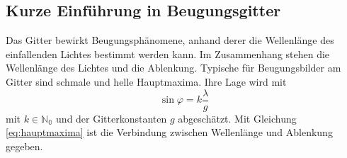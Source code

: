 \subsection{Kurze Einführung in Beugungsgitter}
Das Gitter bewirkt Beugungsphänomene, anhand derer die Wellenlänge des einfallenden Lichtes bestimmt werden kann.
Im Zusammenhang stehen die Wellenlänge des Lichtes und die Ablenkung.
%
Typische für Beugungsbilder am Gitter sind schmale und helle Hauptmaxima.
Ihre Lage wird mit 
\begin{equation}
	\sin{\varphi}= k\frac{\lambda}{g} 
	\label{eq:hauptmaxima}
\end{equation}
mit $k\in\mathbb{N_0}$ und der Gitterkonstanten $g$ abgeschätzt.
Mit Gleichung \eqref{eq:hauptmaxima} ist die Verbindung zwischen Wellenlänge und Ablenkung gegeben.

